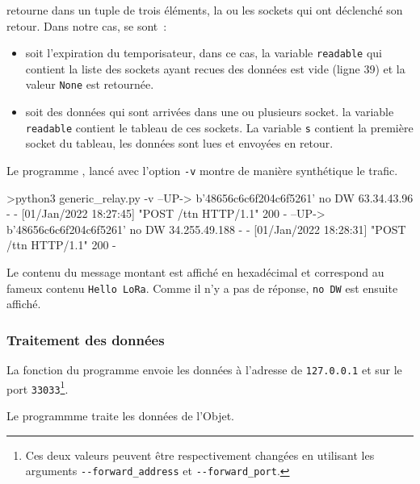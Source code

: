  retourne dans un tuple de trois éléments, la ou les sockets qui ont déclenché son retour. Dans notre cas, se sont~:
\begin{itemize}
    \item soit l'expiration du temporisateur, dans ce cas, la variable \texttt{readable} qui contient la liste des sockets ayant recues des données est vide (ligne 39) et la valeur \texttt{None} est retournée.
    \item soit des données qui sont arrivées dans une ou plusieurs socket. la variable \texttt{readable} contient le tableau de ces sockets. La variable \texttt{s} contient la première socket du tableau, les données sont lues et envoyées en retour.
\end{itemize}


         \vspace{1em}

Le programme , lancé avec l'option \texttt{-v} montre de manière synthétique le trafic. 

\begin{termc}[backgroundcolor=\color{palerod}, basicstyle=\ttfamily\small, escapechar=@]
>python3 generic_relay.py -v
--UP-> b'48656c6c6f204c6f5261'
no DW
63.34.43.96 - - [01/Jan/2022 18:27:45] "POST /ttn HTTP/1.1" 200 -
--UP-> b'48656c6c6f204c6f5261'
no DW
34.255.49.188 - - [01/Jan/2022 18:28:31] "POST /ttn HTTP/1.1" 200 -
\end{termc}

Le contenu du message montant est affiché en hexadécimal et correspond au fameux contenu \texttt{Hello LoRa}. Comme il n'y a pas de réponse, \texttt{no DW} est ensuite affiché.

\subsubsection{Traitement des données}

La fonction \texttt{} du programme  envoie les données à l'adresse de \textit{} \texttt{127.0.0.1} et sur le port \texttt{33033}\footnote{Ces deux valeurs peuvent être respectivement changées  en utilisant les arguments \texttt{-{}-forward\_address} et  \texttt{-{}-forward\_port}.}.

Le programmme  traite les données de l'Objet.


